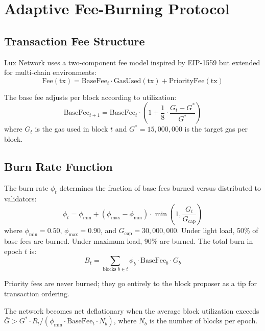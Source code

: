 \section{Adaptive Fee-Burning Protocol}
\label{sec:fees}

\subsection{Transaction Fee Structure}

Lux Network uses a two-component fee model inspired by EIP-1559 \cite{roughgarden2020eip1559} but extended for multi-chain environments:
\begin{equation}
    \text{Fee}(\text{tx}) = \text{BaseFee}_t \cdot \text{GasUsed}(\text{tx}) + \text{PriorityFee}(\text{tx})
\end{equation}

The base fee adjusts per block according to utilization:
\begin{equation}\label{eq:basefee}
    \text{BaseFee}_{t+1} = \text{BaseFee}_t \cdot \left(1 + \frac{1}{8} \cdot \frac{G_t - G^*}{G^*}\right)
\end{equation}
where $G_t$ is the gas used in block $t$ and $G^* = 15{,}000{,}000$ is the target gas per block.

\subsection{Burn Rate Function}

The burn rate $\phi_t$ determines the fraction of base fees burned versus distributed to validators:
\begin{equation}\label{eq:burn}
    \phi_t = \phi_{\min} + (\phi_{\max} - \phi_{\min}) \cdot \min\left(1, \frac{G_t}{G_{\text{cap}}}\right)
\end{equation}
where $\phi_{\min} = 0.50$, $\phi_{\max} = 0.90$, and $G_{\text{cap}} = 30{,}000{,}000$. Under light load, 50\% of base fees are burned. Under maximum load, 90\% are burned. The total burn in epoch $t$ is:
\begin{equation}
    B_t = \sum_{\text{blocks } b \in t} \phi_b \cdot \text{BaseFee}_b \cdot G_b
\end{equation}

Priority fees are never burned; they go entirely to the block proposer as a tip for transaction ordering.

\begin{proposition}
The network becomes net deflationary when the average block utilization exceeds $\bar{G} > G^* \cdot R_t / (\phi_{\min} \cdot \text{BaseFee}_t \cdot N_b)$, where $N_b$ is the number of blocks per epoch.
\end{proposition}


